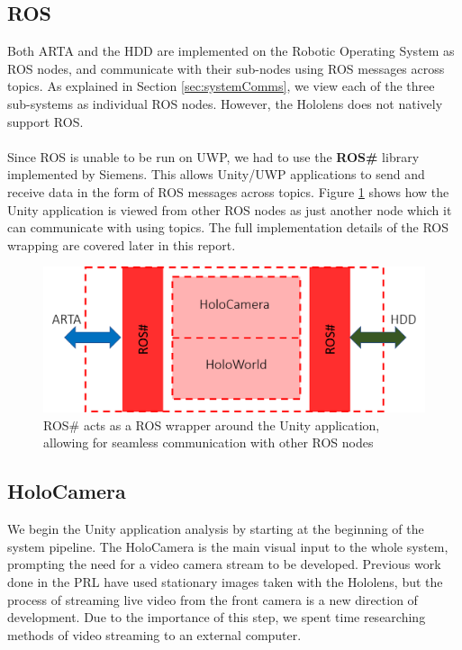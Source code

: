 \subsection{ROS}
Both ARTA and the HDD are implemented on the Robotic Operating System as ROS nodes, and communicate with their sub-nodes using ROS messages across topics. As explained in Section \ref{sec:systemComms}, we view each of the three sub-systems as individual ROS nodes. However, the Hololens does not natively support ROS.

\paragraph{} Since ROS is unable to be run on UWP, we had to use the \textbf{ROS\#} library implemented by Siemens. This allows Unity/UWP applications to send and receive data in the form of ROS messages across topics. Figure \ref{fig:holoROSWrapper} shows how the Unity application is viewed from other ROS nodes as just another node which it can communicate with using topics. The full implementation details of the ROS wrapping are covered later in this report. 

\begin{figure}[ht!]
	\centering
	\includegraphics[width=0.8\linewidth]{img/chapter4_analysis/holoROSSharpWrapper.png}
	\caption{ROS\# acts as a ROS wrapper around the Unity application, allowing for seamless communication with other ROS nodes}
	\label{fig:holoROSWrapper}
\end{figure}

\subsection{HoloCamera}
We begin the Unity application analysis by starting at the beginning of the system pipeline. The HoloCamera is the main visual input to the whole system, prompting the need for a video camera stream to be developed. Previous work done in the PRL have used stationary images taken with the Hololens, but the process of streaming live video from the front camera is a new direction of development. Due to the importance of this step, we spent time researching methods of video streaming to an external computer.

